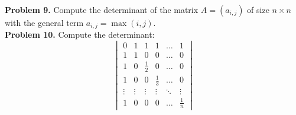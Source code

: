 \documentclass{article}
\begin{document}
\textbf{Problem 9.}
Compute the determinant of the matrix \( A = (a_{i,j}) \) of size \( n \times n \) with the general term \( a_{i,j} = \max(i, j) \).
\\

\textbf{Problem 10.}
Compute the determinant:
\[
\begin{vmatrix}
0 & 1 & 1 & 1 & \dots & 1 \\
1 & 1 & 0 & 0 & \dots & 0 \\
1 & 0 & \frac{1}{2} & 0 & \dots & 0 \\
1 & 0 & 0 & \frac{1}{3} & \dots & 0 \\
\vdots & \vdots & \vdots & \vdots & \ddots & \vdots \\
1 & 0 & 0 & 0 & \dots & \frac{1}{n}
\end{vmatrix}
\]
\end{document}
